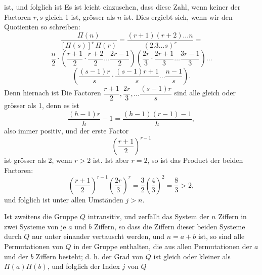 ist, und folglich ist
Es ist leicht einzusehen, dass diese Zahl, wenn keiner der
Factoren $r, s$ gleich 1 ist, grösser als $n$ ist. Dies ergiebt sich,
wenn wir den Quotienten so schreiben:
\[
\frac{\Pi(n)}{[\Pi(s)]^r\,\Pi(r)} = \frac{(r+1)(r+2)\dots n}{(2.3\dots s)^r} =
\]
\[
\frac{n}{2}\cdot\left(\frac{r+1}{2}\cdot\frac{r+2}{2}\dots\frac{2r-1}{2}\right)\left(\frac{2r}{3}\cdot\frac{2r+1}{3}\dots\frac{3r-1}{3}\right)\dots
\]
\[
\left(\frac{(s-1)r}{s}\cdot\frac{(s-1)r+1}{s}\dots\frac{n-1}{s}\right).
\]
Denn hiernach ist
Die Factoren $\dfrac{r+1}{2}, \dfrac{2r}{3}, \dots \dfrac{(s-1)r}{s}$ sind alle gleich oder
grösser als 1, denn es ist
\[
\frac{(h-1)r}{h} - 1 = \frac{(h-1)(r-1)-1}{h},
\]
also immer positiv, und der erste Factor
\[
\left(\frac{r+1}{2}\right)^{r-1}
\]
ist grösser als 2, wenn $r > 2$ ist. Ist aber $r = 2$, so ist das
Product der beiden Factoren:
\[
\left(\frac{r+1}{2}\right)^{r-1}\left(\frac{2r}{3}\right)^r = \frac{3}{2}\left(\frac{4}{3}\right)^2 = \frac{8}{3} > 2,
\]
und folglich ist unter allen Umständen $j > n$.

Ist zweitens die Gruppe $Q$ intransitiv, und zerfällt das
System der $n$ Ziffern in zwei Systeme von je $a$ und $b$ Ziffern, so
dass die Ziffern dieser beiden Systeme durch $Q$ nur unter einander
 vertauscht werden, und $n = a + b$ ist, so sind alle Permutationen
 von $Q$ in der Gruppe enthalten, die aus allen Permutationen
 der $a$ und der $b$ Ziffern besteht; d. h. der Grad
von $Q$ ist gleich oder kleiner als $\Pi(a)\Pi(b)$, und folglich der
Index $j$ von $Q$

